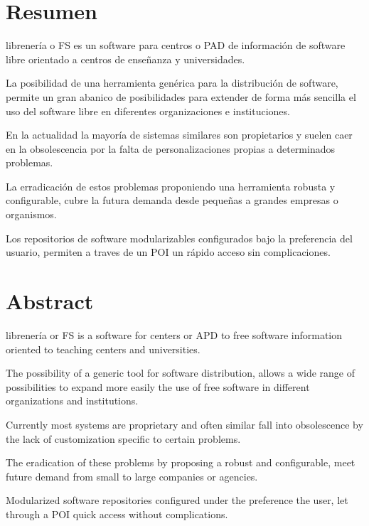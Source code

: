 
\chapter*{Resumen}

 librenería o \acf{FS} es un software para centros 
o \acf{PAD} de información de software libre 
orientado a centros de enseñanza y universidades.

La posibilidad de una herramienta genérica para la distribución de software,
permite un gran abanico de posibilidades para extender de forma más sencilla
el uso del software libre en diferentes organizaciones e instituciones.

En la actualidad la mayoría de sistemas similares son propietarios y suelen
caer en la obsolescencia por la falta de personalizaciones propias a
determinados problemas.

La erradicación de estos problemas proponiendo una herramienta robusta y
configurable, cubre la futura demanda desde pequeñas a grandes empresas o
organismos.

Los repositorios de software modularizables configurados bajo la preferencia
del usuario, permiten a traves de un \acf{POI} un rápido acceso sin
complicaciones.

\newpage
\begin{minipage}[c][5cm][c]{1em}   %
\end{minipage}
\newpage

\chapter*{Abstract}

 librenería or \acf{FS} is a software for centers or \acf{APD} to
free software information oriented to teaching centers and universities.

The possibility of a generic tool for software distribution,
allows a wide range of possibilities to expand more easily
the use of free software in different organizations and institutions.

Currently most systems are proprietary and often similar
fall into obsolescence by the lack of customization specific to
certain problems.

The eradication of these problems by proposing a robust and
configurable, meet future demand from small to large companies or
agencies.

Modularized software repositories configured under the preference
the user, let through a \acf{POI} quick access without
complications.

\newpage
\begin{minipage}[c][5cm][c]{1em}   %
\end{minipage}
\newpage

